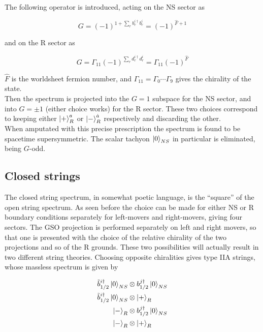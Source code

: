 The following operator is introduced, acting on the NS sector as

\begin{equation}
	G = (-1)^{1+\sum_r b_r^{i\dagger} b_r^i} = (-1)^{\hat F + 1}
	\label{}
\end{equation}

and on the R sector as

\begin{equation}
	G = \Gamma_{11}(-1)^{\sum_r d_r^{i\dagger} d_r^i} = \Gamma_{11} (-1)^{\hat F}
	\label{}
\end{equation}

$\hat F$ is the worldsheet fermion number, and $\Gamma_{11} = \Gamma_0 \cdots\Gamma_9$ gives the chirality of the state.\\

Then the spectrum is projected into the $G=1$ subspace for the NS sector, and into $G=\pm1$ (either choice works) for the R sector. These two choices correspond to keeping either $\ket{+}^a_R$ or $\ket{-}^{\dot a}_R$ respectively and discarding the other.\\

When amputated with this precise prescription the spectrum is found to be spacetime supersymmetric. The scalar tachyon $\ket{0}_{NS}$ in particular is eliminated, being $G$-odd.


\subsection{Closed strings}

The closed string spectrum, in somewhat poetic language, is the ``square'' of the open string spectrum. As seen before the choice can be made for either NS or R boundary conditions separately for left-movers and right-movers, giving four sectors. The GSO projection is performed separately on left and right movers, so that one is presented with the choice of the relative chirality of the two projections and so of the R grounds. These two possibilities will actually result in two different string theories. Choosing opposite chiralities gives type IIA strings, whose massless spectrum is given by

\begin{align}
	\tilde b_{1/2}^{i\dagger} \ket 0_{NS} &\otimes b_{1/2}^{j\dagger}\ket{0}_{NS} \\
	\tilde b_{1/2}^{i\dagger} \ket 0_{NS} &\otimes \ket{+}_{R}\\
	\ket{-}_R &\otimes b_{1/2}^{j\dagger}\ket{0}_{NS}\\
	\ket{-}_R &\otimes \ket{+}_R
	\label{}
\end{align}

